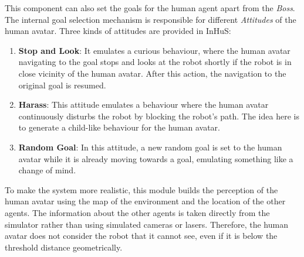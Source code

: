 This component can also set the goals for the human agent apart from the \textit{Boss}. The internal goal selection mechanism is responsible for different \textit{Attitudes} of the human avatar. Three kinds of attitudes are provided in InHuS:
\begin{enumerate}
    \item \textbf{Stop and Look}: It emulates a curious behaviour, where the human avatar navigating to the goal stops and looks at the robot shortly if the robot is in close vicinity of the human avatar. After this action, the navigation to the original goal is resumed.
    \item \textbf{Harass}: This attitude emulates a behaviour where the human avatar continuously disturbs the robot by blocking the robot's path. The idea here is to generate a child-like behaviour for the human avatar.
    \item \textbf{Random Goal}: In this attitude, a new random goal is set to the human avatar while it is already moving towards a goal, emulating something like a change of mind.
\end{enumerate}
To make the system more realistic, this module builds the perception of the human avatar using the map of the environment and the location of the other agents. The information about the other agents is taken directly from the simulator rather than using simulated cameras or lasers. Therefore, the human avatar does not consider the robot that it cannot see, even if it is below the threshold distance geometrically.

